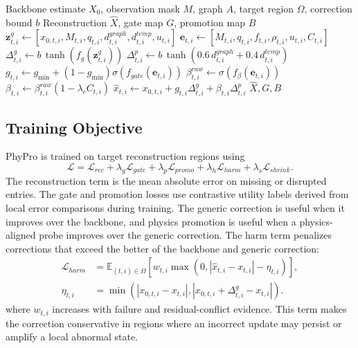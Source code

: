 \documentclass[preprint,12pt]{elsarticle}
\begin{document}
\begin{algorithm}[t]
\caption{Local physics-reliability promoted correction}
\label{alg:phypro}
\begin{algorithmic}[1]
\Require Backbone estimate $X_0$, observation mask $M$, graph $A$, target region $\Omega$, correction bound $b$
\Ensure Reconstruction $\hat{X}$, gate map $G$, promotion map $B$
  \State $\mathbf{z}^{g}_{t,i}\gets [x_{0,t,i}, M_{t,i}, q_{t,i}, d^{graph}_{t,i}, d^{temp}_{t,i}, u_{t,i}]$
  \State $\mathbf{e}_{t,i}\gets [M_{t,i}, q_{t,i}, f_{t,i}, \rho_{t,i}, u_{t,i}, C_{t,i}]$
  \State $\Delta^{g}_{t,i}\gets b\,\tanh(f_g(\mathbf{z}^{g}_{t,i}))$
  \State $\Delta^{p}_{t,i}\gets b\,\tanh(0.6\,d^{graph}_{t,i}+0.4\,d^{temp}_{t,i})$
  \State $g_{t,i}\gets g_{\min}+(1-g_{\min})\sigma(f_{gate}(\mathbf{e}_{t,i}))$
  \State $\beta^{raw}_{t,i}\gets\sigma(f_{\beta}(\mathbf{e}_{t,i}))$
  \State $\beta_{t,i}\gets\beta^{raw}_{t,i}(1-\lambda_c C_{t,i})$
  \State $\hat{x}_{t,i}\gets x_{0,t,i}+g_{t,i}\Delta^g_{t,i}+\beta_{t,i}\Delta^p_{t,i}$
\EndFor
\State \Return $\hat{X},G,B$
\end{algorithmic}
\end{algorithm}

\subsection{Training Objective}
PhyPro is trained on target reconstruction regions using
\begin{equation}
  \mathcal{L}
  =
  \mathcal{L}_{rec}
  +\lambda_g\mathcal{L}_{gate}
  +\lambda_p\mathcal{L}_{promo}
  +\lambda_h\mathcal{L}_{harm}
  +\lambda_s\mathcal{L}_{shrink}.
\end{equation}
The reconstruction term is the mean absolute error on missing or disrupted entries. The gate and promotion losses use contrastive utility labels derived from local error comparisons during training. The generic correction is useful when it improves over the backbone, and physics promotion is useful when a physics-aligned probe improves over the generic correction. The harm term penalizes corrections that exceed the better of the backbone and generic correction:
\begin{align}
  \mathcal{L}_{harm}
  &=
  \mathbb{E}_{(t,i)\in\Omega}
  \left[
  w_{t,i}
  \max
  \left(
  0,
  |\hat{x}_{t,i}-x_{t,i}|-
  \eta_{t,i}
  \right)
  \right], \\
  \eta_{t,i}
  &=
  \min\left(
  |x_{0,t,i}-x_{t,i}|,
  |x_{0,t,i}+\Delta^g_{t,i}-x_{t,i}|
  \right).
\end{align}
where $w_{t,i}$ increases with failure and residual-conflict evidence. This term makes the correction conservative in regions where an incorrect update may persist or amplify a local abnormal state.
\end{document}
